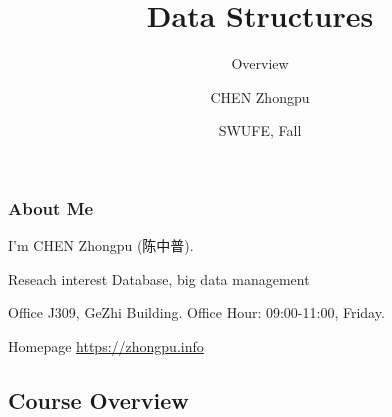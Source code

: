 \documentclass[aspectratio=169, 14pt]{beamer}
\title[Data Structures] %
{Data Structures}
\subtitle{Overview}
\author[CHEN Zhongpu] %
{CHEN Zhongpu}
\institute[] %
{
	School of Computing and Artificial Intelligence \\
	\href{mailto:zpchen@swufe.edu.cn}{zpchen@swufe.edu.cn}
}
\date[] %
{SWUFE, Fall \the\year{}}
\begin{document}
\frame{\titlepage}

\begin{frame}
	\frametitle{About Me}
	I'm CHEN Zhongpu (陈中普).

	\begin{block}{ Reseach interest}
		Database, big data management
	\end{block}

	\begin{block}{ Office}
		J309, GeZhi Building. Office Hour: 09:00-11:00, Friday.
	\end{block}

	\begin{block}{ Homepage}
		\href{https://zhongpu.info}{https://zhongpu.info}
	\end{block}

\end{frame}

{
\begin{frame}
	\section{\textcolor{darkmidnightblue}{Course Overview}}
\end{frame}

}
\end{document}
